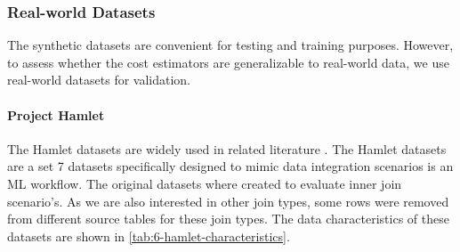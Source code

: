 \subsubsection{Real-world Datasets}
The synthetic datasets are convenient for testing and training purposes. However, to assess whether the cost estimators are generalizable to real-world data, we use real-world datasets for validation.

\paragraph{Project Hamlet \cite{2016-hamlet-sigmod}}
The Hamlet datasets are widely used in related literature \cite{2016-hamlet-sigmod, amalur, morpheus,orion_learning_gen_lin_models}. The Hamlet datasets are a set 7 datasets specifically designed to mimic data integration scenarios is an ML workflow. The original datasets where created to evaluate inner join scenario's. As we are also interested in other join types, some rows were removed from different source tables for these join types. The data characteristics of these datasets are shown in \autoref{tab:6-hamlet-characteristics}.


